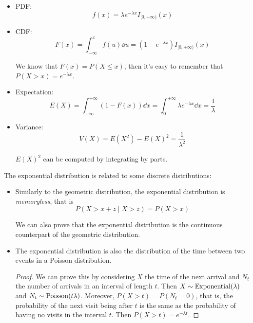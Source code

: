 \documentclass[14pt]{extarticle}
\newcommand{\Poisson}{{\operatorfont Poisson}}
\newcommand{\Exponential}{{\operatorfont Exponential}}
\begin{document}
\begin{itemize}
    \item PDF:
          \begin{equation}
              f(x) = \lambda e^{-\lambda x} I_{[0, +\infty)}(x)
          \end{equation}
    \item CDF:
          \begin{equation}
              F(x) = \int_{-\infty}^x f(u) \dd{u} = (1 - e^{-\lambda x})I_{[0, +\infty)}(x)
          \end{equation}

          We know that $F(x) = P(X \leq x)$, then it's easy to remember that $P(X > x) = e^{-\lambda x}$.
    \item Expectation:
          \begin{equation}
              E(X) = \int_{-\infty}^{+\infty} (1 - F(x)) \dd{x} = \int_0^{+\infty} \lambda e^{-\lambda x} \dd{x} = \frac{1}{\lambda}
          \end{equation}
    \item Variance:
          \begin{equation}
              V(X) = E(X^2) - E(X)^2 = \frac{1}{\lambda^2}
          \end{equation}

          $E(X)^2$ can be computed by integrating by parts.
\end{itemize}

The exponential distribution is related to some discrete distributions:
\begin{itemize}
    \item Similarly to the geometric distribution, the exponential distribution is \emph{memoryless}, that is
          \begin{equation}
              P(X > x + z \mid X > z) = P(X > x)
          \end{equation}

          We can also prove that the exponential distribution is the continuous counterpart of the geometric distribution.

    \item
          The exponential distribution is also the distribution of the time between two events in a Poisson distribution.

          \begin{proof}
              We can prove this by considering $X$ the time of the next arrival and $N_t$ the number of arrivals in an interval of length $t$.
              Then $X \sim \Exponential(\lambda)$ and $N_t \sim \Poisson(t \lambda)$.
              Moreover, $P(X > t) = P(N_t = 0)$, that is, the probability of the next visit being after $t$ is the same as the probability of having no visits in the interval $t$.
              Then $P(X > t) = e^{-\lambda t}$.
          \end{proof}
\end{itemize}
\end{document}
